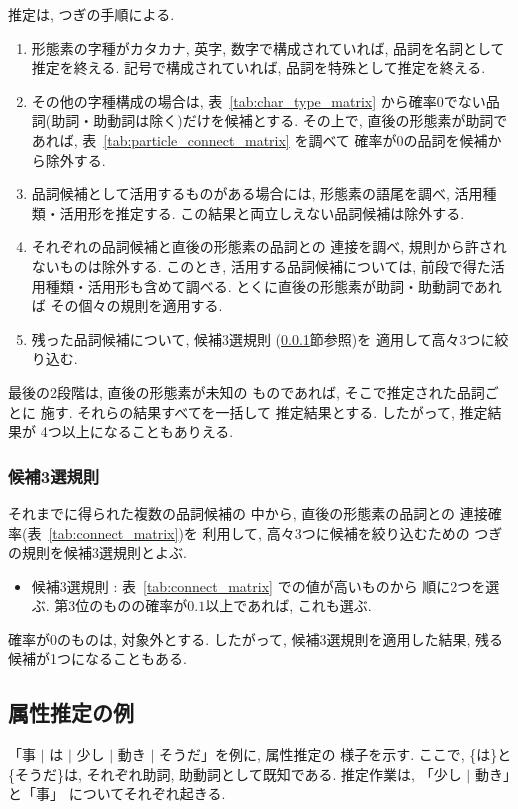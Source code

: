 推定は, つぎの手順による.  
\begin{enumerate}
\item
形態素の字種がカタカナ, 英字, 数字で構成されていれば, 
品詞を名詞として推定を終える.  記号で構成されていれば, 
品詞を特殊として推定を終える.  
\item
その他の字種構成の場合は, 表~\ref{tab:char_type_matrix}
から確率$0$でない品詞(助詞・助動詞は除く)だけを候補とする.  
その上で, 直後の形態素が助詞であれば, 
表~\ref{tab:particle_connect_matrix} を調べて
確率が$0$の品詞を候補から除外する.  
\item
品詞候補として活用するものがある場合には, 
形態素の語尾を調べ, 活用種類・活用形を推定する.  
この結果と両立しえない品詞候補は除外する.  
\item
それぞれの品詞候補と直後の形態素の品詞との
連接を調べ, 規則から許されないものは除外する.  
このとき, 活用する品詞候補については, 
前段で得た活用種類・活用形も含めて調べる.  
とくに直後の形態素が助詞・助動詞であれば
その個々の規則を適用する.  
\item
残った品詞候補について, 候補3選規則
(\ref{narrowing}節参照)を
適用して高々3つに絞り込む.  
\end{enumerate}

最後の2段階は, 直後の形態素が未知の
ものであれば, そこで推定された品詞ごとに
施す.  それらの結果すべてを一括して
推定結果とする.  したがって, 推定結果が
4つ以上になることもありえる.  

\subsubsection{候補3選規則}
\label{narrowing}
それまでに得られた複数の品詞候補の
中から, 直後の形態素の品詞との
連接確率(表~\ref{tab:connect_matrix})を
利用して, 
高々3つに候補を絞り込むための
つぎの規則を候補3選規則とよぶ.  
\begin{itemize}
\item
候補3選規則 : 
表~\ref{tab:connect_matrix} での値が高いものから
順に2つを選ぶ.  
第3位のものの確率が$0.1$以上であれば, 
これも選ぶ.  
\end{itemize}
確率が$0$のものは, 対象外とする.  
したがって, 候補3選規則を適用した結果, 
残る候補が1つになることもある.  


\subsection{属性推定の例}
「事 $\mid$  は  $\mid$  少し $\mid$  
動き  $\mid$  そうだ」を例に, 属性推定の
様子を示す.  ここで, \{は\}と\{そうだ\}は, 
それぞれ助詞, 助動詞として既知である.  
推定作業は, 「少し $\mid$  動き」と「事」
についてそれぞれ起きる.  

